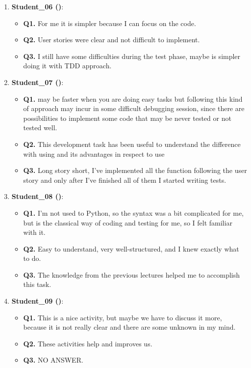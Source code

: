 \begin{enumerate}
    \item \textbf{Student\_06 (\notdd)}: 
    \begin{itemize}
        \item \textbf{Q1.} For me it is simpler because I can focus on the code.
        \item \textbf{Q2.} User stories were clear and not difficult to implement.
        \item \textbf{Q3.} I still have some difficulties during the test phase, maybe is simpler doing it with TDD approach.
    \end{itemize}

    \item \textbf{Student\_07 (\notdd)}: 
    \begin{itemize}
        \item \textbf{Q1.} \notdd may be faster when you are doing easy tasks but following this kind of approach may incur in some difficult debugging session, since there are possibilities to implement some code that may be never tested or not tested well.
        \item \textbf{Q2.} This development task has been useful to understand the difference with using \tdd and its advantages in respect to use \notdd
        \item \textbf{Q3.} Long story short, I've implemented all the function following the user story and only after I've finished all of them I started writing tests.
    \end{itemize}

    \item \textbf{Student\_08 (\notdd)}: 
    \begin{itemize}
        \item \textbf{Q1.} I'm not used to Python, so the syntax was a bit complicated for me, but \notdd is the classical way of coding and testing for me, so I felt familiar with it.
        \item \textbf{Q2.} Easy to understand, very well-structured, and I knew exactly what to do.
        \item \textbf{Q3.} The knowledge from the previous lectures helped me to accomplish this task.
    \end{itemize}

    \item \textbf{Student\_09 (\notdd)}: 
    \begin{itemize}
        \item \textbf{Q1.} This is a nice activity, but maybe we have to discuss it more, because it is not really clear and there are some unknown in my mind.
        \item \textbf{Q2.} These activities help and improves us.
        \item \textbf{Q3.} NO ANSWER.
    \end{itemize}
\end{enumerate}


